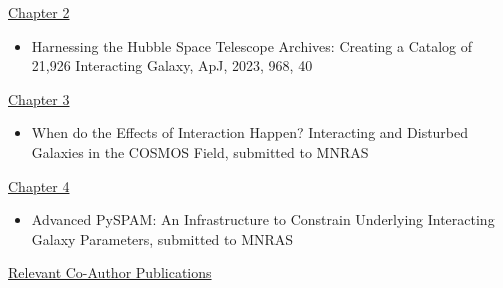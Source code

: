 


\begin{pubs}        %
\newif\ifshowcitations\showcitationsfalse%
\newif\ifshowlinks\showlinksfalse%

%
%
%

\ifshowlinks%
  \usepackage[
         colorlinks=true,
         urlcolor=blue,       %
         ]{hyperref}
  \newcommand*{\inspireurl}[1]{\\\href{#1}{INSPIRE-HEP entry}}
\else
  \makeatletter
  \newcommand*{\inspireurl}[1]{\@bsphack\@esphack}
  \makeatother
\fi
\ifshowcitations%
  \newcommand*{\citations}[1]{\\* #1}
\else
  \makeatletter
  \newcommand*{\citations}[1]{\@bsphack\@esphack}
  \makeatother
\fi
\renewcommand{\labelenumii}{\arabic{enumi}.\arabic{enumii}}


%
\underline{Chapter 2}
\begin{itemize}
	\item Harnessing the Hubble Space Telescope Archives: Creating a Catalog of 21,926 Interacting Galaxy, ApJ, 2023, 968, 40
\end{itemize}

\underline{Chapter 3}
\begin{itemize}
	\item When do the Effects of Interaction Happen? Interacting and Disturbed Galaxies in the COSMOS Field, submitted to MNRAS
\end{itemize}

\underline{Chapter 4}
\begin{itemize}
	\item Advanced PySPAM: An Infrastructure to Constrain Underlying Interacting Galaxy Parameters, submitted to MNRAS
\end{itemize}

\underline{Relevant Co-Author Publications}

\end{pubs}

